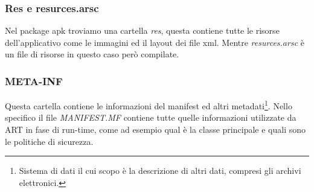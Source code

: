 \subsubsection{Res e resurces.arsc}
Nel package apk troviamo una cartella \textit{res}, questa contiene tutte le risorse dell'applicativo come le immagini ed il layout dei file xml. Mentre \textit{resurces.arsc} è un file di risorse in questo caso però compilate. 
\subsubsection{META-INF}
Questa cartella contiene le informazioni del manifest ed altri metadati\footnote{Sistema di dati il cui scopo è la descrizione di altri dati, compresi gli archivi elettronici.}. Nello specifico il file \textit{MANIFEST.MF} contiene tutte quelle informazioni utilizzate da ART in fase di run-time, come ad esempio qual è la classe principale e quali sono le politiche di sicurezza. 









